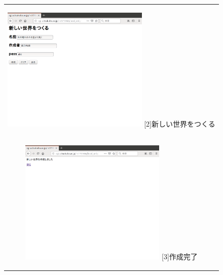 \documentclass[12pt,a4paper]{jarticle}
\begin{document}
\begin{ttfamily}
\begin{figure}[htbp]
\begin{center}
\begin{tabular}{c}
      \begin{minipage}{0.53\hsize}
        \begin{center}
          \includegraphics[width=7.0cm]{10-3-2.eps}
          \hspace{1.6cm} [2]新しい世界をつくる
        \end{center}
      \end{minipage}

      \begin{minipage}{0.55\hsize}
        \vspace{90mm}
      \end{minipage} \\
 
      \begin{minipage}{0.53\hsize}
        \begin{center}
          \includegraphics[width=7.0cm]{10-3-3.eps}
          \hspace{1.0cm} [3]作成完了
        \end{center}
      \end{minipage}


\end{tabular}
\end{center}
\end{figure}
\end{ttfamily}
\end{document}

